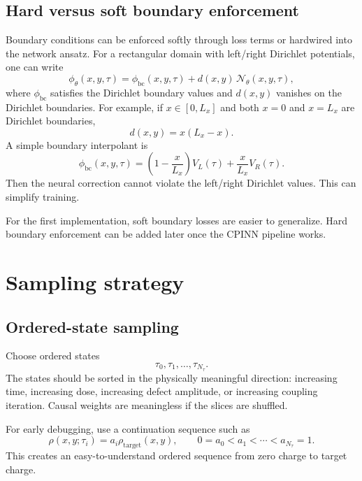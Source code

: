 \documentclass[11pt]{article}
\newcommand{\phinn}{\phi_{\theta}}
\newcommand{\taud}{\tau}
\begin{document}
\subsection{Hard versus soft boundary enforcement}

Boundary conditions can be enforced softly through loss terms or hardwired into the network ansatz. For a rectangular domain with left/right Dirichlet potentials, one can write
\begin{equation}
\phinn(x,y,\taud)=\phi_{\mathrm{bc}}(x,y,\taud)+d(x,y)\,\mathcal{N}_{\theta}(x,y,\taud),
\label{eq:hard_bc_ansatz}
\end{equation}
where $\phi_{\mathrm{bc}}$ satisfies the Dirichlet boundary values and $d(x,y)$ vanishes on the Dirichlet boundaries. For example, if $x\in[0,L_x]$ and both $x=0$ and $x=L_x$ are Dirichlet boundaries,
\begin{equation}
d(x,y)=x(L_x-x).
\end{equation}
A simple boundary interpolant is
\begin{equation}
\phi_{\mathrm{bc}}(x,y,\taud)=\left(1-\frac{x}{L_x}\right)V_L(\taud)+\frac{x}{L_x}V_R(\taud).
\end{equation}
Then the neural correction cannot violate the left/right Dirichlet values. This can simplify training.

For the first implementation, soft boundary losses are easier to generalize. Hard boundary enforcement can be added later once the CPINN pipeline works.

\section{Sampling strategy}

\subsection{Ordered-state sampling}

Choose ordered states
\begin{equation}
\taud_0,\taud_1,\ldots,\taud_{N_\taud}.
\end{equation}
The states should be sorted in the physically meaningful direction: increasing time, increasing dose, increasing defect amplitude, or increasing coupling iteration. Causal weights are meaningless if the slices are shuffled.

For early debugging, use a continuation sequence such as
\begin{equation}
\rho(x,y;\taud_i)=a_i\rho_{\mathrm{target}}(x,y),
\qquad
0=a_0<a_1<\cdots<a_{N_\taud}=1.
\label{eq:amplitude_continuation}
\end{equation}
This creates an easy-to-understand ordered sequence from zero charge to target charge.
\end{document}
